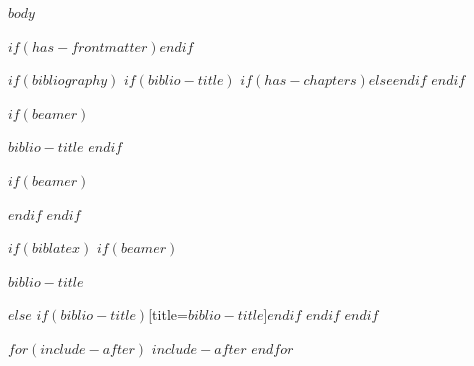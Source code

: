 \documentclass[
  $if(fontsize)$
    $fontsize$,
  $endif$
  $if(papersize)$$papersize$$else$a4paper$endif$,
  $for(classoption)$$classoption$$sep$,$endfor$,
  captions=tableheading
]{$if(beamer)$$documentclass$$else$$if(book)$scrbook$else$scrartcl$endif$$endif$}
\begin{document}
$body$

$if(has-frontmatter)$\backmatter$endif$

$if(bibliography)$
  $if(biblio-title)$
    $if(has-chapters)$\renewcommand\bibname{$biblio-title$}$else$\renewcommand\refname{$biblio-title$}$endif$
  $endif$

  $if(beamer)$
    \begin{frame}[allowframebreaks]{$biblio-title$}
      \bibliographytrue
  $endif$

  

  $if(beamer)$
    \end{frame}
  $endif$
$endif$

$if(biblatex)$
  $if(beamer)$
    \begin{frame}[allowframebreaks]{$biblio-title$}
      \bibliographytrue
      \printbibliography[heading=none]
    \end{frame}
  $else$
    \printbibliography$if(biblio-title)$[title=$biblio-title$]$endif$
  $endif$
$endif$

$for(include-after)$
  $include-after$
$endfor$
\end{document}
